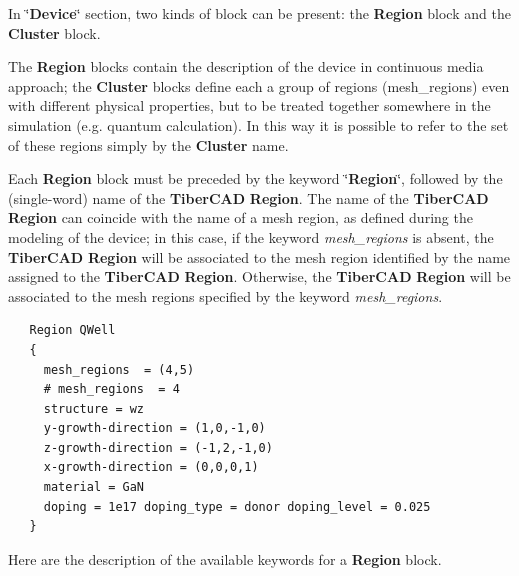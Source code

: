 In \char`\"{}\textbf{Device}\char`\"{} section,
two  kinds of  block can be  present: the \textbf{Region} block and the \textbf{Cluster} block.
%

The \textbf{Region} blocks contain the  description of the device in  continuous media approach; 
the \textbf{Cluster} blocks define each  a group of regions (mesh\_regions) even with different physical properties, but to be  
treated together  somewhere in the simulation (e.g. quantum calculation). In this way it is  possible to refer to the 
set of these regions simply by the \textbf{Cluster} name.



Each  \textbf{Region} block must be preceded by the keyword \char`\"{}\textbf{Region}\char`\"{}, followed by the  (single-word) name of the \textbf{TiberCAD} \textbf{Region}.
The name  of  the \textbf{TiberCAD} \textbf{Region}   can  coincide with the   name  of a  mesh region, as  defined during the  modeling of the  device; in this case, if the  keyword  \textit{mesh\_regions} is  absent, the \textbf{TiberCAD} \textbf{Region} will be  associated to the   mesh region identified  by the name assigned to the \textbf{TiberCAD} \textbf{Region}.
Otherwise,  the \textbf{TiberCAD} \textbf{Region} will be  associated to the   mesh regions specified by  the  keyword \textit{mesh\_regions}.

\begin{verbatim}
   Region QWell
   {
     mesh_regions  = (4,5)
     # mesh_regions  = 4
     structure = wz
     y-growth-direction = (1,0,-1,0)
     z-growth-direction = (-1,2,-1,0)
     x-growth-direction = (0,0,0,1)
     material = GaN
     doping = 1e17 doping_type = donor doping_level = 0.025
   }
\end{verbatim}
Here are the  description of  the available keywords for a \textbf{Region} block.

